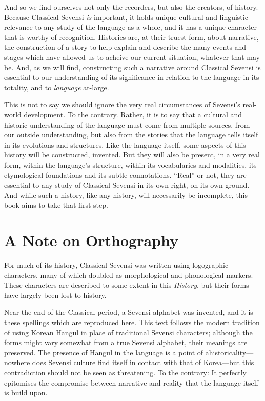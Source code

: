 And so we find ourselves not only the recorders, but also the creators, of history.
Because Classical Sevensi \emph{is} important, it holds unique cultural and linguistic relevance to any study of the language as a whole, and it has a unique character that is worthy of recognition.
Histories are, at their truest form, about narrative, the construction of a story to help explain and describe the many events and stages which have allowed us to acheive our current situation, whatever that may be.
And, as we will find, constructing such a narrative around Classical Sevensi is essential to our understanding of its significance in relation to the language in its totality, and to \emph{language} at-large.

This is not to say we should ignore the very real circumstances of Sevensi's real-world development.
To the contrary.
Rather, it is to say that a cultural and historic understanding of the language must come from multiple sources, from our outside understanding, but also from the stories that the language tells itself in its evolutions and structures.
Like the language itself, some aspects of this history will be constructed, invented.
But they will also be present, in a very real form, within the language's structure, within its vocabularies and modalities, its etymological foundations and its subtle connotations.
“Real” or not, they are essential to any study of Classical Sevensi in its own right, on its own ground.
And while such a history, like any history, will necessarily be incomplete, this book aims to take that first step.

\chapter{A Note on Orthography} \label{orthography}

For much of its history, Classical Sevensi was written using logographic characters, many of which doubled as morphological and phonological markers.
These characters are described to some extent in this \emph{History}, but their forms have largely been lost to history.

Near the end of the Classical period, a Sevensi alphabet was invented, and it is these spellings which are reproduced here.
This text follows the modern tradition of using Korean Hangul in place of traditional Sevensi characters; although the forms might vary somewhat from a true Sevensi alphabet, their meanings are preserved.
The presence of Hangul in the language is a point of ahistoricality—nowhere does Sevensi culture find itself in contact with that of Korea—but this contradiction should not be seen as threatening.
To the contrary: It perfectly epitomises the compromise between narrative and reality that the language itself is build upon.

